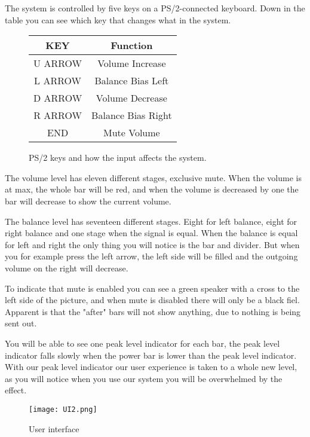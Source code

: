 The system is controlled by five keys on a PS/2-connected keyboard. Down in the table you can see which key that changes what in the system.


\begin{figure}[h]
\centering
\begin{tabular}{|c|c|}
\hline
KEY & Function\\ \hline
U ARROW & Volume Increase\\ \hline
L ARROW & Balance Bias Left\\ \hline
D ARROW &  Volume Decrease\\ \hline
R ARROW &  Balance Bias Right\\ \hline
END		&  Mute Volume\\ \hline
\end{tabular}
\caption{PS/2 keys and how the input affects the system.}
\label{fig:scancodes}
\end{figure}


The volume level has eleven different stages, exclusive mute. When the volume is at max, the whole bar will be red, and when the volume is decreased by one the bar will decrease to show the current volume.

The balance level has seventeen different stages. Eight for left balance, eight for right balance and one stage when the signal is equal. When the balance is equal for left and right the only thing you will notice is the bar and divider. But when you for example press the left arrow, the left side will be filled and the outgoing volume on the right will decrease.

To indicate that mute is enabled you can see a green speaker with a cross to the left side of the picture, and when mute is disabled there will only be a black fiel. Apparent is that the "after" bars will not show anything, due to nothing is being sent out. 

You will be able to see one peak level indicator for each bar, the peak level indicator falls slowly when the power bar is lower than the peak level indicator. With our peak level indicator our user experience is taken to a whole new level, as you will notice when you use our system you will be overwhelmed by the effect.

\begin{figure}[h]
	\centering
        \texttt{[image: UI2.png]}
       \caption{User interface}
        \label{fig:user interface}
\end{figure}


